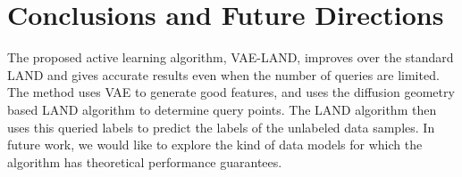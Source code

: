 \documentclass{article}
\begin{document}
\section{Conclusions and Future Directions}
\label{sec:Conclusions}
The proposed active learning algorithm, VAE-LAND, improves over the standard LAND and gives accurate results even when the number of queries are limited. The method uses VAE to generate good features, and uses the diffusion geometry based LAND algorithm to determine query points. The LAND algorithm then uses this queried labels to predict the labels of the unlabeled data samples. In future work, we would like to explore the kind of data models for which the algorithm has theoretical performance guarantees.   




\end{document}
